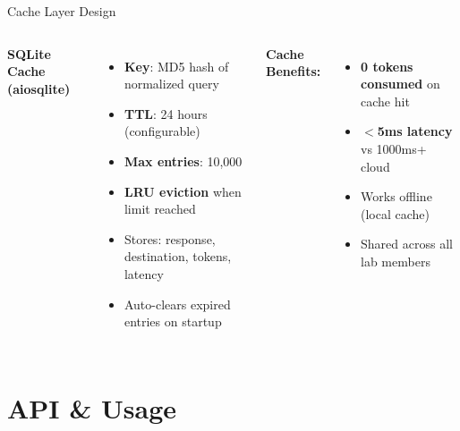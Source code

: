 \documentclass[aspectratio=169]{beamer}
\begin{document}
\begin{frame}{Cache Layer Design}
\begin{columns}
\textbf{SQLite Cache (aiosqlite)}
\begin{itemize}
  \item \textbf{Key}: MD5 hash of normalized query
  \item \textbf{TTL}: 24 hours (configurable)
  \item \textbf{Max entries}: 10,000
  \item \textbf{LRU eviction} when limit reached
  \item Stores: response, destination, tokens, latency
  \item Auto-clears expired entries on startup
\end{itemize}
\vspace{0.3cm}
\textbf{Cache Benefits:}
\begin{itemize}
  \item[\color{cacheyellow}$\star$] \textbf{0 tokens consumed} on cache hit
  \item[\color{cacheyellow}$\star$] \textbf{$<$5ms latency} vs 1000ms+ cloud
  \item[\color{cacheyellow}$\star$] Works offline (local cache)
  \item[\color{cacheyellow}$\star$] Shared across all lab members
\end{itemize}
\end{columns}
\end{frame}

\section{API \& Usage}
\end{document}
